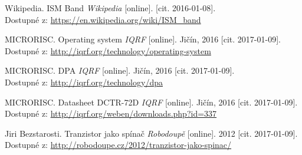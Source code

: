 \documentclass[12pt,a4paper,oneside]{article}
\begin{document}
\begin{thebibliography}{99}


Wikipedia. ISM Band \emph{Wikipedia} [online]. [cit. 2016-01-08]. \\ Dostupné z: \url{https://en.wikipedia.org/wiki/ISM\_band}

MICRORISC. Operating system \emph{IQRF} [online]. Jičín, 2016 [cit. 2017-01-09]. \\ Dostupné z: \url{http://iqrf.org/technology/operating-system}

MICRORISC. DPA \emph{IQRF} [online]. Jičín, 2016 [cit. 2017-01-09]. \\ Dostupné z: \url{http://iqrf.org/technology/dpa}

MICRORISC. Datasheet DCTR-72D \emph{IQRF} [online]. Jičín, 2016 [cit. 2017-01-09]. \\ Dostupné z: \url{http://iqrf.org/weben/downloads.php?id=337}

Jiri Bezstarosti. Tranzistor jako spínač \emph{Robodoupě} [online]. 2012 [cit. 2017-01-09]. \\ Dostupné z: \url{http://robodoupe.cz/2012/tranzistor-jako-spinac/}

\end{thebibliography}

\newpage

\listoffigures


\listoftables

\end{document}
